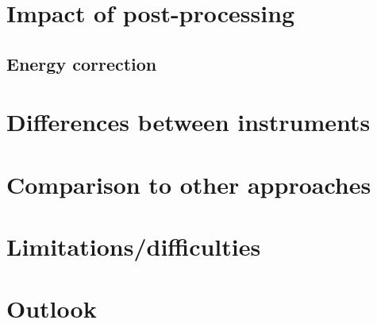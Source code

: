 \section{Impact of post-processing}

\subsection{Energy correction}

\section{Differences between instruments}

\section{Comparison to other approaches}

\section{Limitations/difficulties}


\section{Outlook}


